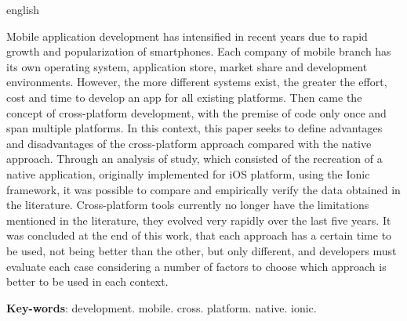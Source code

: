 \begin{resumo}[Abstract]
 \begin{otherlanguage*}{english}
  
  \begin{comment}
  O desenvolvimento de aplicativos móveis intensificou-se nos últimos anos devido ao crescimento acelerado e popularização dos \textit{smartphones}. Cada empresa
  do ramo móvel possui seu próprio sistema operacional, loja de aplicativos, parcela de mercado e ambientes de desenvolvimento. No entanto, quanto mais 
  sistemas diferentes existem, maior o esforço, custo e tempo para desenvolver um \textit{app} para todas as plataformas existentes. Surgiu então, o conceito de desenvolvimento multiplataforma,
  com a premissa de codificar apenas uma vez e abranger várias plataformas. Neste contexto, o presente trabalho busca definir vantagens e desvantagens da abordagem
  multiplataforma quando comparada com a abordagem nativa. Por meio da análise de um exemplo de uso, que consistiu na recriação de um aplicativo nativo, implementado originalmente para a plataforma iOS,
  utilizando o \textit{framework} Ionic, foi possível comparar e comprovar empiricamente os dados obtidos na literatura. As ferramentas multiplataforma, atualmente,
  não possuem mais as limitações apontadas pela literatura, pois evoluíram muito rapidamente ao longo dos últimos cinco anos. Concluiu-se, ao fim desse trabalho, que cada abordagem tem um momento certo
  para ser utilizada, não sendo uma melhor que a outra, mas apenas diferentes entre si, e deve-se avaliar cada caso, considerando-se uma série de fatores para escolher qual abordagem utilizar.
  \end{comment}

  Mobile application development has intensified in recent years due to rapid growth and popularization of smartphones. Each company of 
  mobile branch has its own operating system, application store, market share and development environments. 
  However, the more different systems exist, the greater the effort, cost and time to develop an app for all existing platforms. Then came the concept of cross-platform development, 
  with the premise of code only once and span multiple platforms. In this context, this paper seeks to define advantages and disadvantages of the cross-platform approach 
  compared with the native approach. Through an analysis of study, which consisted of the recreation of a native application, originally implemented for iOS platform, 
  using the Ionic framework, it was possible to compare and empirically verify the data obtained in the literature. Cross-platform tools currently 
  no longer have the limitations mentioned in the literature, they evolved very rapidly over the last five years. It was concluded at the end of this work, that each approach has a certain time 
  to be used, not being better than the other, but only different, and developers must evaluate each case considering a number of factors to choose which approach is better to be used in each context.

  \vspace{\onelineskip}

  \noindent 
  \textbf{Key-words}: development. mobile. cross. platform. native. ionic.
 \end{otherlanguage*}
\end{resumo}
